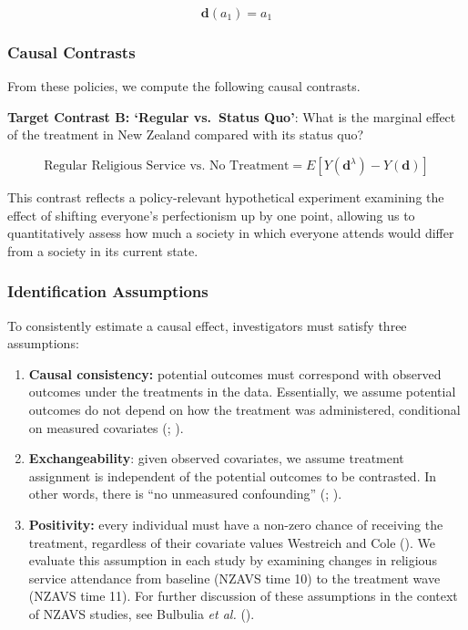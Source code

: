 \documentclass[
  single column]{article}
\begin{document}
\[
\mathbf{d}(a_1) = a_1
\]

\subsubsection{Causal Contrasts}\label{causal-contrasts}

From these policies, we compute the following causal contrasts.

\textbf{Target Contrast B: `Regular vs.~Status Quo'}: What is the
marginal effect of the treatment in New Zealand compared with its status
quo?

\[ \text{Regular Religious Service vs. No Treatment} = E[Y(\mathbf{d}^\lambda) - Y(\mathbf{d})] \]

This contrast reflects a policy-relevant hypothetical experiment
examining the effect of shifting everyone's perfectionism up by one
point, allowing us to quantitatively assess how much a society in which
everyone attends would differ from a society in its current state.

\subsubsection{Identification
Assumptions}\label{identification-assumptions}

To consistently estimate a causal effect, investigators must satisfy
three assumptions:

\begin{enumerate}
\def\labelenumi{\arabic{enumi}.}
\item
  \textbf{Causal consistency:} potential outcomes must correspond with
  observed outcomes under the treatments in the data. Essentially, we
  assume potential outcomes do not depend on how the treatment was
  administered, conditional on measured covariates
  (;
  ).
\item
  \textbf{Exchangeability}: given observed covariates, we assume
  treatment assignment is independent of the potential outcomes to be
  contrasted. In other words, there is ``no unmeasured confounding''
  (;
  ).
\item
  \textbf{Positivity:} every individual must have a non-zero chance of
  receiving the treatment, regardless of their covariate values
  Westreich and Cole (). We evaluate
  this assumption in each study by examining changes in religious
  service attendance from baseline (NZAVS time 10) to the treatment wave
  (NZAVS time 11). For further discussion of these assumptions in the
  context of NZAVS studies, see Bulbulia \emph{et al.}
  ().
\end{enumerate}
\end{document}
